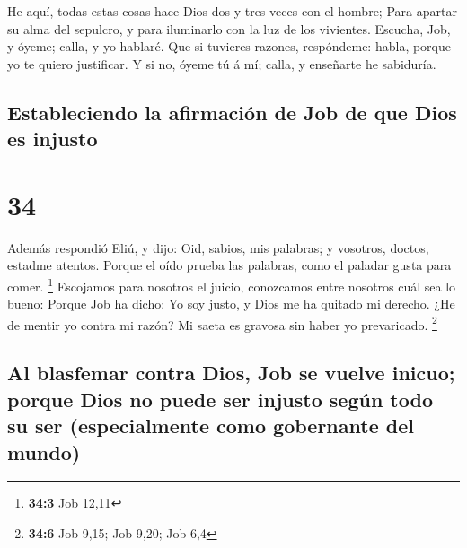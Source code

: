  He aquí, todas estas cosas hace Dios dos y tres veces
con el hombre;  Para apartar su alma del sepulcro, y para
iluminarlo con la luz de los vivientes.  Escucha, Job, y
óyeme; calla, y yo hablaré.  Que si tuvieres razones,
respóndeme: habla, porque yo te quiero justificar.  Y si
no, óyeme tú á mí; calla, y enseñarte he sabiduría.

\hypertarget{estableciendo-la-afirmaciuxf3n-de-job-de-que-dios-es-injusto}{%
\subsection{Estableciendo la afirmación de Job de que Dios es
injusto}\label{estableciendo-la-afirmaciuxf3n-de-job-de-que-dios-es-injusto}}

\hypertarget{section-33}{%
\section{34}\label{section-33}}

 Además respondió Eliú, y dijo:  Oid,
sabios, mis palabras; y vosotros, doctos, estadme atentos.
 Porque el oído prueba las palabras, como el paladar gusta
para comer. \footnote{\textbf{34:3} Job 12,11}  Escojamos
para nosotros el juicio, conozcamos entre nosotros cuál sea lo bueno:
 Porque Job ha dicho: Yo soy justo, y Dios me ha quitado
mi derecho.  ¿He de mentir yo contra mi razón? Mi saeta es
gravosa sin haber yo prevaricado. \footnote{\textbf{34:6} Job 9,15; Job
  9,20; Job 6,4}

\hypertarget{al-blasfemar-contra-dios-job-se-vuelve-inicuo-porque-dios-no-puede-ser-injusto-seguxfan-todo-su-ser-especialmente-como-gobernante-del-mundo}{%
\subsection{Al blasfemar contra Dios, Job se vuelve inicuo; porque Dios
no puede ser injusto según todo su ser (especialmente como gobernante
del
mundo)}\label{al-blasfemar-contra-dios-job-se-vuelve-inicuo-porque-dios-no-puede-ser-injusto-seguxfan-todo-su-ser-especialmente-como-gobernante-del-mundo}}

